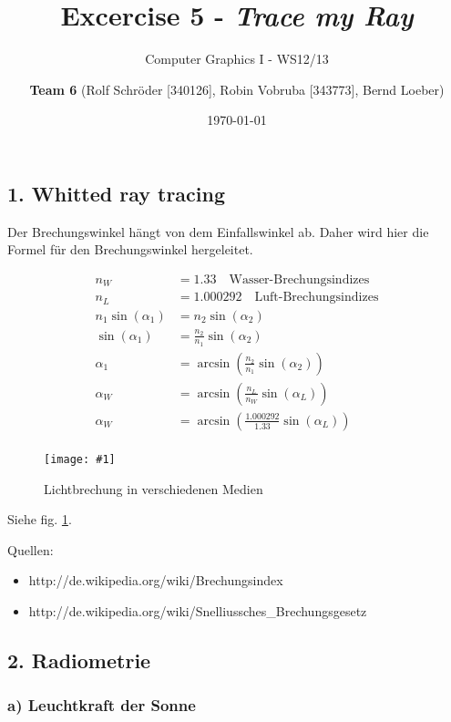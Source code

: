 \documentclass[a4paper,headings=small]{scrartcl}
\title{Excercise 5 - \emph{Trace my Ray}}
\subtitle{Computer Graphics I - WS12/13}
\author{\textbf{Team 6} (Rolf Schröder [340126], Robin Vobruba [343773], Bernd Loeber)}
\date{\today}
\numberwithin{equation}{section} %
\numberwithin{figure}{section}   %
\newcommand{\image}[3]{
	\begin{figure}[htbp]
		\centering
		\texttt{[image: \#1]}
		\caption{#3}
		\label{fig:#1}
	\end{figure}
}
\begin{document}
\maketitle

\subsection*{1. Whitted ray tracing}

Der Brechungswinkel hängt von dem Einfallswinkel ab.
Daher wird hier die Formel für den Brechungswinkel hergeleitet.

\begin{align*}
n_W &= 1.33 \quad \text{Wasser-Brechungsindizes} \\
n_L &= 1.000292 \quad \text{Luft-Brechungsindizes} \\
n_1 \sin(\alpha_1) &= n_2 \sin(\alpha_2) \\
\sin(\alpha_1) &= \frac{n_2}{n_1} \sin(\alpha_2) \\
\alpha_1 &= \arcsin(\frac{n_2}{n_1} \sin(\alpha_2)) \\
\alpha_W &= \arcsin(\frac{n_L}{n_W} \sin(\alpha_L)) \\
\alpha_W &= \arcsin(\frac{1.000292}{1.33} \sin(\alpha_L)) \\
\end{align*}

\image{img/brechungswinkel}{0.8}{Lichtbrechung in verschiedenen Medien}

Siehe fig. \ref{fig:img/brechungswinkel}.

Quellen:
\begin{itemize}
\item http://de.wikipedia.org/wiki/Brechungsindex
\item http://de.wikipedia.org/wiki/Snelliussches\_Brechungsgesetz
\end{itemize}


\subsection*{2. Radiometrie}

\subsubsection*{a) Leuchtkraft der Sonne}
\end{document}
